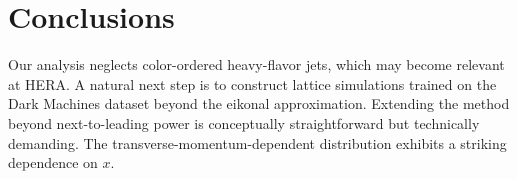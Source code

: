 \section{Conclusions}\label{sec:conclusions}

Our analysis neglects color-ordered heavy-flavor jets, which may become
relevant at HERA. A natural next step is to construct lattice
simulations trained on the Dark Machines dataset beyond the eikonal
approximation. Extending the method beyond next-to-leading power is
conceptually straightforward but technically demanding. The
transverse-momentum-dependent distribution exhibits a striking
dependence on $x$.

